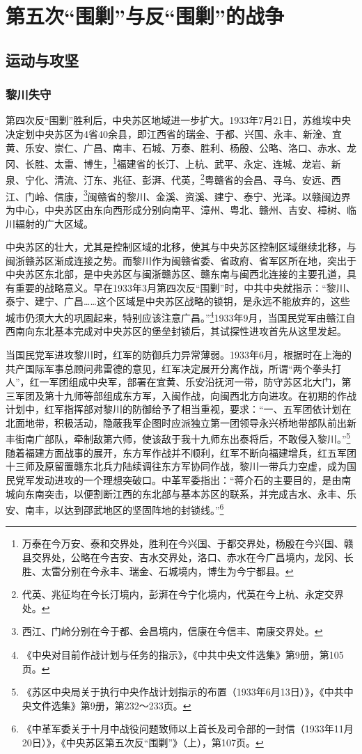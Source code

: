 \chapter{第五次“围剿”与反“围剿”的战争}

\section{运动与攻坚}

\subsection{黎川失守}


第四次反“围剿”胜利后，中央苏区地域进一步扩大。1933年7月21日，苏维埃中央决定划中央苏区为4省40余县，即江西省的瑞金、于都、兴国、永丰、新淦、宜黄、乐安、崇仁、广昌、南丰、石城、万泰、胜利、杨殷、公略、洛口、赤水、龙冈、长胜、太雷、博生，\footnote{万泰在今万安、泰和交界处，胜利在今兴国、于都交界处，杨殷在今兴国、赣县交界处，公略在今吉安、吉水交界处，洛口、赤水在今广昌境内，龙冈、长胜、太雷分别在今永丰、瑞金、石城境内，博生为今宁都县。}福建省的长汀、上杭、武平、永定、连城、龙岩、新泉、宁化、清流、汀东、兆征、彭湃、代英，\footnote{代英、兆征均在今长汀境内，彭湃在今宁化境内，代英在今上杭、永定交界处。}粤赣省的会昌、寻乌、安远、西江、门岭、信康，\footnote{西江、门岭分别在今于都、会昌境内，信康在今信丰、南康交界处。}闽赣省的黎川、金溪、资溪、建宁、泰宁、光泽。以赣闽边界为中心，中央苏区由东向西形成分别向南平、漳州、粤北、赣州、吉安、樟树、临川辐射的广大区域。


中央苏区的壮大，尤其是控制区域的北移，使其与中央苏区控制区域继续北移，与闽浙赣苏区渐成连接之势。而黎川作为闽赣省委、省政府、省军区所在地，突出于中央苏区东北部，是中央苏区与闽浙赣苏区、赣东南与闽西北连接的主要孔道，具有重要的战略意义。早在1933年3月第四次反“围剿”时，中共中央就指示：“黎川、泰宁、建宁、广昌……这个区域是中央苏区战略的锁钥，是永远不能放弃的，这些城市仍须大大的巩固起来，特别应该注意广昌。”\footnote{《中央对目前作战计划与任务的指示》，《中共中央文件选集》第9册，第105页。}1933年9月，当国民党军由赣江自西南向东北基本完成对中央苏区的堡垒封锁后，其试探性进攻首先从这里发起。


当国民党军进攻黎川时，红军的防御兵力异常薄弱。1933年6月，根据时在上海的共产国际军事总顾问弗雷德的意见，红军决定展开分离作战，所谓“两个拳头打人”，红一军团组成中央军，部署在宜黄、乐安沿抚河一带，防守苏区北大门，第三军团及第十九师等部组成东方军，入闽作战，向闽西北方向进攻。在初期的作战计划中，红军指挥部对黎川的防御给予了相当重视，要求：“一、五军团依计划在北面地带，积极活动，隐蔽我军企图时应派独立第一团领导永兴桥地带部队前出新丰街南广部队，牵制敌第六师，使该敌于我十九师东出泰将后，不敢侵入黎川。”\footnote{《苏区中央局关于执行中央作战计划指示的布置（1933年6月13日）》，《中共中央文件选集》第9册，第232～233页。}随着福建方面战事的展开，东方军作战并不顺利，红军不断向福建增兵，红五军团十三师及原留置赣东北兵力陆续调往东方军协同作战，黎川一带兵力空虚，成为国民党军发动进攻的一个理想突破口。中革军委指出：“蒋介石的主要目的，是由南城向东南突击，以便割断江西的东北部与基本苏区的联系，并完成吉水、永丰、乐安、南丰，以达到邵武地区的坚固阵地的封锁线。”\footnote{《中革军委关于十月中战役问题致师以上首长及司令部的一封信（1933年11月20日）》，《中央苏区第五次反“围剿”》（上），第107页。}


